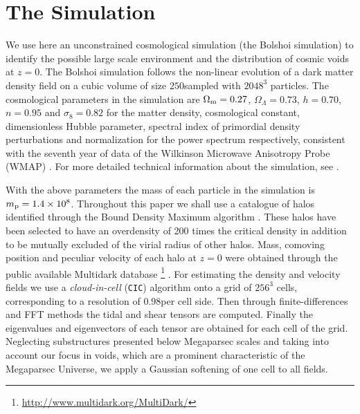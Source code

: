 \documentclass[a4,useAMS,usenatbib,usegraphicx]{latex/mn2e}
\begin{document}
\section{The Simulation}
\label{sec:the_simulation}


We use here an unconstrained cosmological simulation (the Bolshoi 
simulation) to identify the possible large scale environment and the 
distribution of cosmic voids at $z=0$. The Bolshoi simulation follows the 
non-linear evolution of a dark matter density field on a cubic volume of 
size $250$\hMpc sampled with $2048^3$ particles. The cosmological 
parameters in the simulation are $\Omega_{\rm m}=0.27$, $\Omega_{\Lambda}
=0.73$, $h=0.70$, $n=0.95$ and $\sigma_{8}=0.82$ for the matter density, 
cosmological constant, dimensionless Hubble parameter, spectral index of 
primordial density perturbations and normalization for the power spectrum
respectively, consistent with the seventh year of data of the Wilkinson 
Microwave Anisotropy Probe (WMAP) \citep{Jarosik11}. For more detailed 
technical information about the simulation, see \citet{Klypin11}.


With the above parameters the mass of each particle in the simulation is 
$m_{\rm p}=1.4\times 10^{8}$\hMsun. Throughout this paper we shall use a
catalogue of halos identified through the Bound Density Maximum algorithm
\citep{Klypin99}. These halos have been selected to have an overdensity of
200 times the critical density in addition to be mutually excluded of the
virial radius of other halos. Mass, comoving position and peculiar 
velocity of each halo at $z=0$ were obtained through the public available 
Multidark database \footnote{\url{http://www.multidark.org/MultiDark/}} 
\citep{Riebe11}. For estimating the density and velocity fields we use a 
\textit{cloud-in-cell} (\texttt{CIC}) algorithm onto a grid of $256^3$ 
cells, corresponding to a resolution of $0.98$\hMpc per cell side. Then 
through finite-differences and FFT methods the tidal and shear tensors 
are computed. Finally the eigenvalues and eigenvectors of each tensor are
obtained for each cell of the grid. Neglecting substructures presented 
below Megaparsec scales and taking into account our focus in voids, which 
are a prominent characteristic of the Megaparsec Universe, we apply a 
Gaussian softening of one cell to all fields.
\end{document}
